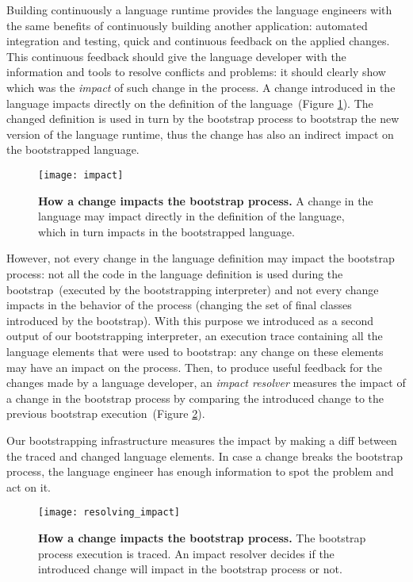 Building continuously a language runtime provides the language engineers with the same benefits of continuously building another application: automated integration and testing, quick and continuous feedback on the applied changes. This continuous feedback should give the language developer with the information and tools to resolve conflicts and problems: it should clearly show which was the \emph{impact} of such change in the process. A change introduced in the language impacts directly on the definition of the language~(Figure \ref{fig:impact}). The changed definition is used in turn by the bootstrap process to bootstrap the new version of the language runtime, thus the change has also an indirect impact on the bootstrapped language. 

\begin{figure}[ht]
\center
\texttt{[image: impact]}
\caption{\textbf{How a change impacts the bootstrap process.} A change in the language may impact directly in the definition of the language, which in turn impacts in the bootstrapped language.\label{fig:impact}}
\end{figure}

However, not every change in the language definition may impact the bootstrap process: not all the code in the language definition is used during the bootstrap~(\ie executed by the bootstrapping interpreter) and not every change impacts in the behavior of the process (\eg changing the set of final classes introduced by the bootstrap). With this purpose we introduced as a second output of our bootstrapping interpreter, an execution trace containing all the language elements that were used to bootstrap: any change on these elements may have an impact on the process. Then, to produce useful feedback for the changes made by a language developer, an \emph{impact resolver} measures the impact of a change in the bootstrap process by comparing the introduced change to the previous bootstrap execution~(Figure \ref{fig:resolving_impact}).

Our bootstrapping infrastructure measures the impact by making a diff between the traced and changed language elements. In case a change breaks the bootstrap process, the language engineer has enough information to spot the problem and act on it.

\begin{figure}[ht]
\center
\texttt{[image: resolving\_impact]}
\caption{\textbf{How a change impacts the bootstrap process.} The bootstrap process execution is traced. An impact resolver decides if the introduced change will impact in the bootstrap process or not.\label{fig:resolving_impact}}
\end{figure}

